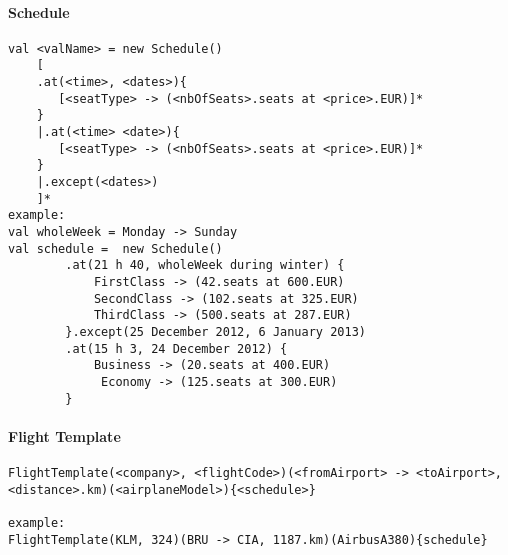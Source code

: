 \paragraph{Schedule}\hfill
\begin{lstlisting}
val <valName> = new Schedule()
	[
	.at(<time>, <dates>){
	   [<seatType> -> (<nbOfSeats>.seats at <price>.EUR)]*
	}
	|.at(<time> <date>){
	   [<seatType> -> (<nbOfSeats>.seats at <price>.EUR)]*
	}
	|.except(<dates>)
	]*
example:
val wholeWeek = Monday -> Sunday
val schedule =  new Schedule()
		.at(21 h 40, wholeWeek during winter) {
			FirstClass -> (42.seats at 600.EUR)
			SecondClass -> (102.seats at 325.EUR)
			ThirdClass -> (500.seats at 287.EUR)
		}.except(25 December 2012, 6 January 2013)
		.at(15 h 3, 24 December 2012) {
			Business -> (20.seats at 400.EUR)
			 Economy -> (125.seats at 300.EUR)
		}
\end{lstlisting}

\paragraph{Flight Template}\hfill
\begin{lstlisting}
FlightTemplate(<company>, <flightCode>)(<fromAirport> -> <toAirport>, <distance>.km)(<airplaneModel>){<schedule>}
		
example:
FlightTemplate(KLM, 324)(BRU -> CIA, 1187.km)(AirbusA380){schedule}
\end{lstlisting}
